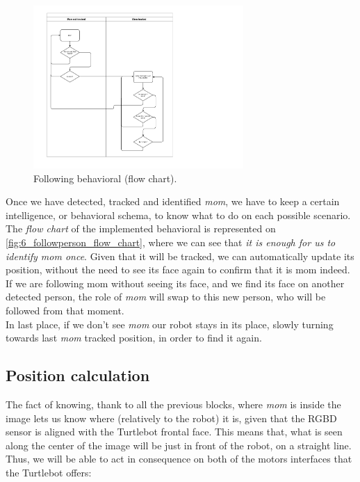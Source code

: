 		\begin{figure}
			\centering
			\includegraphics[width=8cm]{images/followperson_flowchart}
			\caption{Following behavioral (flow chart).}
			\label{fig:6_followperson_flow_chart}
		\end{figure}
		Once we have detected, tracked and identified \emph{mom}, we have to keep a certain intelligence, or behavioral schema, to know what to do on each possible scenario. The \emph{flow chart} of the implemented behavioral is represented on \autoref{fig:6_followperson_flow_chart}, where we can see that \emph{it is enough for us to identify mom once}. Given that it will be tracked, we can automatically update its position,  without the need to see its face again to confirm that it is mom indeed. If we are following mom without seeing its face, and we find its face on another detected person, the role of \emph{mom} will swap to this new person, who will be followed from that moment.\\

		In last place, if we don't see \emph{mom} our robot stays in its place, slowly turning towards last \emph{mom} tracked position, in order to find it again.

	\subsection{Position calculation}
		The fact of knowing, thank to  all the previous blocks, where \emph{mom} is inside the image lets us know where (relatively to the robot) it is, given that the RGBD sensor is aligned with the Turtlebot frontal face. This means that, what is seen along the center of the image will be just in front of the robot, on a straight line. Thus, we will be able to act in consequence on both of the motors interfaces that the Turtlebot offers:
		
